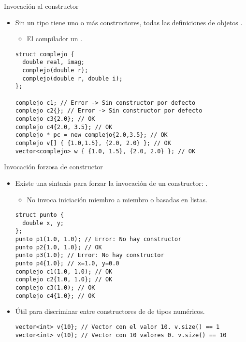 \begin{frame}[fragile]{Invocación al constructor}
\begin{itemize}
  \item Sin un tipo tiene uno o más constructores, 
        todas las definiciones de objetos  
        .
    \begin{itemize}
      \item El compilador  un 
            .
    \end{itemize}
\begin{lstlisting}
struct complejo {
  double real, imag;
  complejo(double r);
  complejo(double r, double i);
};

complejo c1; // Error -> Sin constructor por defecto
complejo c2{}; // Error -> Sin constructor por defecto
complejo c3{2.0}; // OK
complejo c4{2.0, 3.5}; // OK
complejo * pc = new complejo{2.0,3.5}; // OK
complejo v[] { {1.0,1.5}, {2.0, 2.0} }; // OK
vector<complejo> w { {1.0, 1.5}, {2.0, 2.0} }; // OK
\end{lstlisting}
\end{itemize}
\end{frame}

\begin{frame}[fragile]{Invocación forzosa de constructor}
\begin{itemize}
  \item Existe una sintaxis para forzar la invocación de un constructor:
        .
    \begin{itemize}
      \item No invoca iniciación miembro a miembro o basadas en listas.
    \end{itemize}

\begin{lstlisting}
struct punto {
  double x, y;
};
punto p1(1.0, 1.0); // Error: No hay constructor
punto p2{1.0, 1.0}; // OK
punto p3(1.0); // Error: No hay constructor
punto p4{1.0}; // x=1.0, y=0.0
complejo c1(1.0, 1.0); // OK
complejo c2{1.0, 1.0}; // OK
complejo c3(1.0); // OK
complejo c4{1.0}; // OK
\end{lstlisting}

  \item Útil para discriminar entre constructores de  de tipos numéricos.
\begin{lstlisting}
vector<int> v{10}; // Vector con el valor 10. v.size() == 1
vector<int> v(10); // Vector con 10 valores 0. v.size() == 10
\end{lstlisting}
\end{itemize}
\end{frame}

